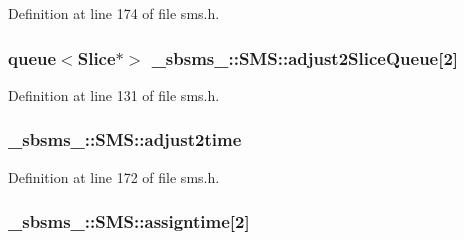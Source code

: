 Definition at line 174 of file sms.\+h.

\subsubsection[{\texorpdfstring{adjust2\+Slice\+Queue}{adjust2SliceQueue}}]{\setlength{\rightskip}{0pt plus 5cm}queue$<${\bf Slice}$\ast$$>$ \+\_\+sbsms\+\_\+\+::\+S\+M\+S\+::adjust2\+Slice\+Queue\mbox{[}2\mbox{]}\hspace{0.3cm}{\ttfamily [protected]}}\hypertarget{class__sbsms___1_1_s_m_s_af5418699dec42bb2954fb7c7a95cfe41}{}\label{class__sbsms___1_1_s_m_s_af5418699dec42bb2954fb7c7a95cfe41}


Definition at line 131 of file sms.\+h.

\subsubsection[{\texorpdfstring{adjust2time}{adjust2time}}]{ \+\_\+sbsms\+\_\+\+::\+S\+M\+S\+::adjust2time\hspace{0.3cm}{\ttfamily [protected]}}\hypertarget{class__sbsms___1_1_s_m_s_a944f5215762039163c3a442f967d88ef}{}\label{class__sbsms___1_1_s_m_s_a944f5215762039163c3a442f967d88ef}


Definition at line 172 of file sms.\+h.

\subsubsection[{\texorpdfstring{assigntime}{assigntime}}]{ \+\_\+sbsms\+\_\+\+::\+S\+M\+S\+::assigntime\mbox{[}2\mbox{]}\hspace{0.3cm}{\ttfamily [protected]}}\hypertarget{class__sbsms___1_1_s_m_s_a0e1dd043e25c053ccf843b637fb40eb6}{}\label{class__sbsms___1_1_s_m_s_a0e1dd043e25c053ccf843b637fb40eb6}


